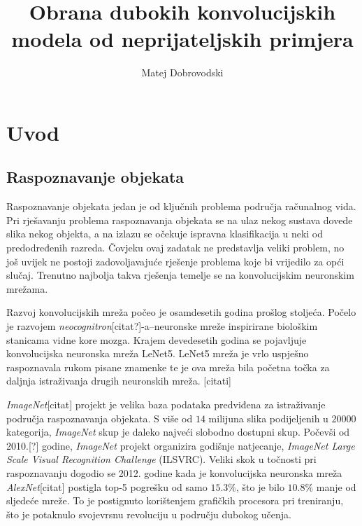 \documentclass[utf8, diplomski]{fer}
\begin{document}

\title{Obrana dubokih konvolucijskih modela od neprijateljskih primjera}

\author{Matej Dobrovodski}

\maketitle

\tableofcontents

\chapter{Uvod}
\section{Raspoznavanje objekata}
Raspoznavanje objekata jedan je od ključnih problema područja računalnog vida. Pri rješavanju problema raspoznavanja objekata se na ulaz nekog sustava dovede slika nekog objekta, a na izlazu se očekuje ispravna klasifikacija u neki od predodređenih razreda. Čovjeku ovaj zadatak ne predstavlja veliki problem, no još uvijek ne postoji zadovoljavajuće rješenje problema koje bi vrijedilo za opći slučaj. Trenutno najbolja takva rješenja temelje se na konvolucijskim neuronskim mrežama. \par
Razvoj konvolucijskih mreža počeo je osamdesetih godina prošlog stoljeća. Počelo je razvojem \textit{neocognitron}[citat?]-a--neuronske mreže inspirirane biološkim stanicama vidne kore mozga. Krajem devedesetih godina se pojavljuje konvolucijska neuronska mreža LeNet5. LeNet5 mreža je vrlo uspješno raspoznavala rukom pisane znamenke te je ova mreža bila početna točka za daljnja istraživanja drugih neuronskih mreža. [citati] \par
\textit{ImageNet}[citat] projekt je velika baza podataka predviđena za istraživanje područja raspoznavanja objekata. S više od $14$ milijuna slika podijeljenih u $20000$ kategorija, \textit{ImageNet} skup je daleko najveći slobodno dostupni skup. Počevši od 2010.[?] godine, \textit{ImageNet} projekt organizira godišnje natjecanje, \textit{ImageNet Large Scale Visual Recognition Challenge} (ILSVRC). Veliki skok u točnosti pri raspoznavanju dogodio se 2012. godine kada je konvolucijska neuronska mreža \textit{AlexNet}[citat] postigla top-5 pogrešku od samo $15.3\%$, što je bilo $10.8\%$ manje od sljedeće mreže. To je postignuto korištenjem grafičkih procesora pri treniranju, što je potaknulo svojevrsnu revoluciju u području dubokog učenja. \par
\end{document}
